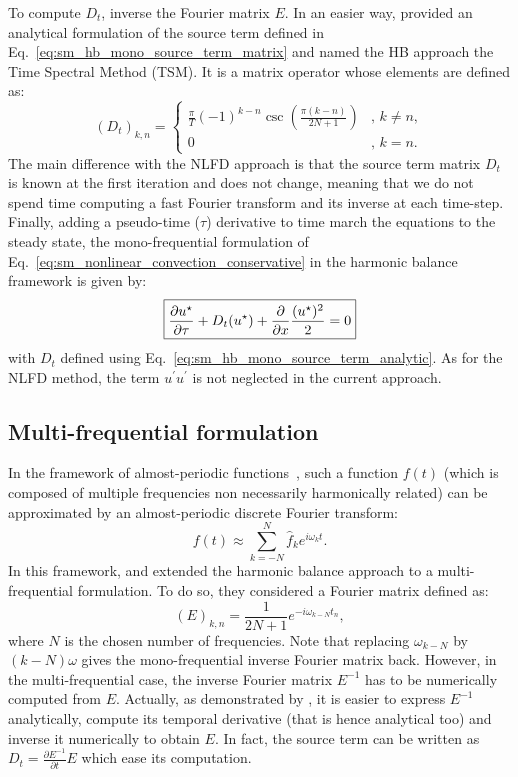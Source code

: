 To compute $D_t$, \citet{Hall2002}
inverse the Fourier matrix $E$.
In an easier way, \citet{Gopinath2005} provided 
an analytical formulation of the source term defined 
in Eq.~\eqref{eq:sm_hb_mono_source_term_matrix} and 
named the HB approach the Time Spectral Method (TSM).
It is a matrix operator whose elements are defined as:
\begin{equation}
  (D_t)_{k, n} =
  \begin{cases}
    \frac{\pi}{T}(-1)^{k-n}\csc\left(\frac{\pi
        (k-n)}{2N+1}\right) &, \, k\neq n,\\
    0 &, \, k=n.
  \end{cases}
  \label{eq:sm_hb_mono_source_term_analytic}
\end{equation}
The main difference with the NLFD approach
is that the source term matrix $D_t$ is known at the first iteration and does
not change, meaning that we do not spend time computing a
fast Fourier transform and its inverse at each time-step.
Finally, adding a pseudo-time ($\tau$) derivative to 
time march the equations to the steady state, 
the mono-frequential formulation of 
Eq.~\eqref{eq:sm_nonlinear_convection_conservative} in the harmonic
balance framework is given by:
\begin{equation}
	\fbox{$
	\displaystyle \frac{\partial u^\star}{\partial \tau} + 
	D_t (u^\star) + 
	\displaystyle \frac{\partial}{\partial x}
		\frac{(u^\star)^2}{2} = 0
	$}
\end{equation}
with $D_t$ defined using Eq.~\eqref{eq:sm_hb_mono_source_term_analytic}.
As for the NLFD method, the term $u^\prime u^\prime$
is not neglected in the current approach.

\subsection{Multi-frequential formulation}
\label{sec:sm_hb_multi}
In the
framework of almost-periodic functions~\cite{Besicovitch1932},
such a function $f(t)$ (which is composed of multiple
frequencies non necessarily harmonically related) can be approximated
by an almost-periodic
discrete Fourier transform:
\begin{equation}
	f(t) \approx \sum_{k=-N}^{N} \widehat{f}_k 
	e^{i \omega_k t}.
\end{equation}
In this framework, \citet{Gopinath2007} and \citet{Ekici2007} 
extended the harmonic balance approach to
a multi-frequential formulation. To do so, they considered
a Fourier matrix defined as:
\begin{equation}
	(E)_{k,n} = \frac{1}{2N+1} e^{-i \omega_{k-N} t_n},
\end{equation}
where $N$ is the chosen number of frequencies.
Note that replacing $\omega_{k-N}$ by $(k - N) \omega$ gives
the mono-frequential inverse Fourier matrix back. 
However, in the multi-frequential case, the inverse Fourier matrix
$E^{-1}$ has to be numerically computed from $E$. Actually, as demonstrated by 
\citet{Gopinath2007}, it is easier to express $E^{-1}$ analytically,
compute its temporal derivative (that is hence analytical too) 
and inverse it numerically to obtain $E$. In fact, the source term
can be written as $D_t = \frac{\partial E^{-1}}{\partial t} E$
which ease its computation.

